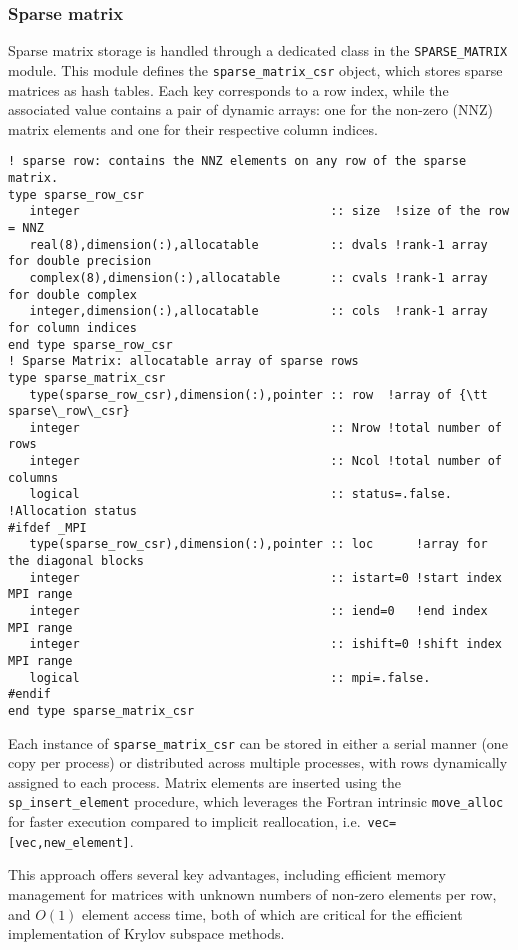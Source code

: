 \documentclass[edipack_sp.tex]{subfiles}
\begin{document}
\subsubsection{Sparse matrix}\label{CodeSparseMatrix}
Sparse matrix storage is handled through a dedicated class in the 
{\tt SPARSE\_MATRIX} module. This module defines the 
{\tt sparse\_matrix\_csr} object, which stores sparse matrices as 
hash tables. Each key corresponds to a row index, while the associated 
value contains a pair of dynamic arrays: one for the non-zero (NNZ) matrix 
elements and one for their respective column indices.

\begin{lstlisting}[style=fstyle,numbers=none]
! sparse row: contains the NNZ elements on any row of the sparse matrix.
type sparse_row_csr
   integer                                   :: size  !size of the row = NNZ
   real(8),dimension(:),allocatable          :: dvals !rank-1 array for double precision
   complex(8),dimension(:),allocatable       :: cvals !rank-1 array for double complex
   integer,dimension(:),allocatable          :: cols  !rank-1 array for column indices
end type sparse_row_csr
! Sparse Matrix: allocatable array of sparse rows
type sparse_matrix_csr
   type(sparse_row_csr),dimension(:),pointer :: row  !array of {\tt sparse\_row\_csr} 
   integer                                   :: Nrow !total number of rows
   integer                                   :: Ncol !total number of columns
   logical                                   :: status=.false. !Allocation status
#ifdef _MPI
   type(sparse_row_csr),dimension(:),pointer :: loc      !array for the diagonal blocks
   integer                                   :: istart=0 !start index MPI range
   integer                                   :: iend=0   !end index MPI range
   integer                                   :: ishift=0 !shift index MPI range
   logical                                   :: mpi=.false.
#endif
end type sparse_matrix_csr
\end{lstlisting}


Each instance of {\tt sparse\_matrix\_csr} can be stored in either 
a serial manner (one copy per process) or distributed across multiple 
processes, with rows dynamically assigned to each process. 
Matrix elements are inserted using the 
{\tt sp\_insert\_element} procedure, which leverages the Fortran 
intrinsic {\tt move\_alloc} for faster execution compared to 
implicit reallocation, i.e.~{\tt vec=[vec,new\_element]}. 

This approach offers several key advantages, including efficient 
memory management for matrices with unknown numbers of non-zero 
elements per row, and $O(1)$ element access time, both of which 
are critical for the efficient implementation of Krylov subspace 
methods.
\end{document}
